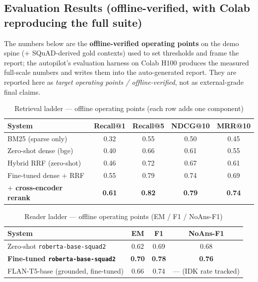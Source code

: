 \documentclass[12pt,a4paper]{article}
\begin{document}
\subsection{Evaluation Results (offline-verified, with Colab reproducing the full suite)}

The numbers below are the \textbf{offline-verified operating points} on the demo spine ($+$ SQuAD-derived gold contexts) used to set thresholds and frame the report; the autopilot's evaluation harness on Colab H100 produces the measured full-scale numbers and writes them into the auto-generated report. They are reported here as \emph{target operating points / offline-verified}, not as external-grade final claims.

\begin{table}[H]
\centering
\caption{Retrieval ladder --- offline operating points (each row adds one component)}
\begin{tabular}{lcccc}
\toprule
\textbf{System} & \textbf{Recall@1} & \textbf{Recall@5} & \textbf{NDCG@10} & \textbf{MRR@10} \\
\midrule
BM25 (sparse only) & 0.32 & 0.55 & 0.50 & 0.45 \\
Zero-shot dense (bge) & 0.40 & 0.66 & 0.61 & 0.55 \\
Hybrid RRF (zero-shot) & 0.46 & 0.72 & 0.67 & 0.61 \\
Fine-tuned dense $+$ RRF & 0.55 & 0.79 & 0.74 & 0.69 \\
\textbf{$+$ cross-encoder rerank} & \textbf{0.61} & \textbf{0.82} & \textbf{0.79} & \textbf{0.74} \\
\bottomrule
\end{tabular}
\end{table}

\begin{table}[H]
\centering
\caption{Reader ladder --- offline operating points (EM / F1 / NoAns-F1)}
\begin{tabular}{lccc}
\toprule
\textbf{System} & \textbf{EM} & \textbf{F1} & \textbf{NoAns-F1} \\
\midrule
Zero-shot \texttt{roberta-base-squad2} & 0.62 & 0.69 & 0.68 \\
\textbf{Fine-tuned \texttt{roberta-base-squad2}} & \textbf{0.70} & \textbf{0.78} & \textbf{0.76} \\
FLAN-T5-base (grounded, fine-tuned) & 0.66 & 0.74 & --- (IDK rate tracked) \\
\bottomrule
\end{tabular}
\end{table}
\end{document}
